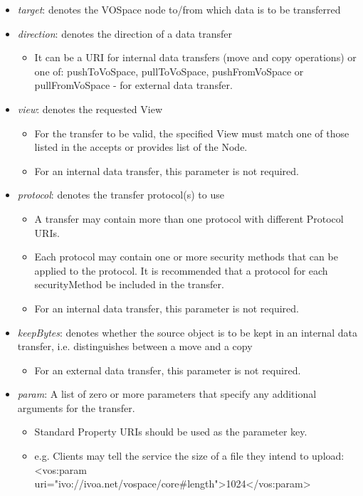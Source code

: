 \documentclass[11pt,a4paper]{ivoa}
\begin{document}
\begin{itemize}
    \item \emph{target}: denotes the VOSpace node to/from which data is to be transferred
    \item \emph{direction}: denotes the direction of a data transfer
        \begin{itemize}
            \item It can be a URI for internal data transfers (move and copy operations) or one of: pushToVoSpace, pullToVoSpace, pushFromVoSpace or pullFromVoSpace - for external data transfer.
        \end{itemize}
    \item \emph{view}: denotes the requested View
        \begin{itemize}
            \item For the transfer to be valid, the specified View must match one of those listed in the accepts or provides list of the Node.
            \item For an internal data transfer, this parameter is not required.
        \end{itemize}
    \item \emph{protocol}: denotes the transfer protocol(s) to use
        \begin{itemize}
            \item A transfer may contain more than one protocol with different Protocol URIs.
            \item Each protocol may contain one or more security methods that can be applied to the protocol.  It is recommended that a protocol for each securityMethod be included in the transfer.
            \item For an internal data transfer, this parameter is not required.
        \end{itemize}
    \item \emph{keepBytes}: denotes whether the source object is to be kept in an internal data transfer, i.e. distinguishes between a move and a copy
        \begin{itemize}
            \item For an external data transfer, this parameter is not required.
        \end{itemize}
    \item \emph{param}: A list of zero or more parameters that specify any additional arguments for the transfer.
        \begin{itemize}
            \item Standard Property URIs should be used as the parameter key.
            \item e.g. Clients may tell the service the size of a file they intend to upload: <vos:param uri="ivo://ivoa.net/vospace/core\#length">1024</vos:param>
        \end{itemize}
\end{itemize}
\end{document}
